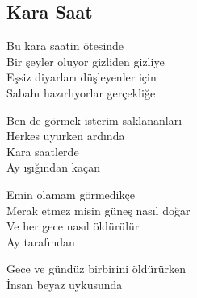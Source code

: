 \subsection{Kara Saat}

Bu kara saatin ötesinde \\
Bir şeyler oluyor gizliden gizliye \\
Eşsiz diyarları düşleyenler için \\
Sabahı hazırlıyorlar gerçekliğe

\noindent\newline
Ben de görmek isterim saklananları \\
Herkes uyurken ardında \\
Kara saatlerde \\
Ay ışığından kaçan

\noindent\newline
Emin olamam görmedikçe \\
Merak etmez misin güneş nasıl doğar \\
Ve her gece nasıl öldürülür \\
Ay tarafından

\noindent\newline
Gece ve gündüz birbirini öldürürken \\
İnsan beyaz uykusunda